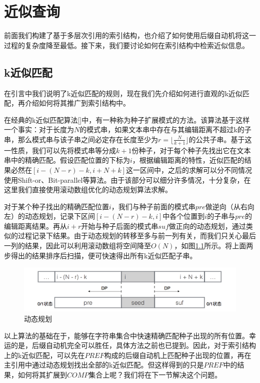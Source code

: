 ﻿\documentclass{sysuthesis}
\begin{document}
\chapter{近似查询}
前面我们构建了基于多层次引用的索引结构，也介绍了如何使用后缀自动机将这一过程的复杂度降至最低。接下来，我们要讨论如何在索引结构中检索近似信息。



\section{k近似匹配}
在引言中我们说明了k近似匹配的规则，现在我们先介绍如何进行直观的k近似匹配，再介绍如何将其推广到索引结构中。\par
在经典的k近似匹配算法[]中，有一种称为种子扩展模式的方法。该算法基于这样一个事实：对于长度为$N$的模式串，如果文本串中存在与其编辑距离不超过k的子串，那么模式串与该子串之间必定存在长度至少为$r = \lfloor \frac{N}{k+1} \rfloor$的公共子串。基于这一性质，我们可以先将模式串等分成$k + 1$份种子，对于每个种子先找出它在文本串中的精确匹配。假设匹配位置的下标为$i$，根据编辑距离的特性，近似匹配的结果必然在$[i - (N - r) - k, i + N + k]$这一区间中，之后的求解可以分不同情况使用Shift-or、Bit-parallel等算法。由于该部分可以细分许多情况，十分复杂，在这里我们直接使用滚动数组优化的动态规划算法求解。\par
对于某个种子找出的精确匹配位置$i$，我们与种子前面的模式串$pre$做逆向（从右向左）的动态规划，记录下区间$[i - (N - r) - k, i]$中各个位置到$i$的子串与$pre$的编辑距离结果。再从$i + r$开始与种子后面的模式串$suf$做正向的动态规划，通过类似的过程记录下结果。由于动态规划的转移至多与前一列有关，而我们只关心最后一列的结果，因此可以利用滚动数组将空间降至$O(N)$，如图\ref{imag_dp}所示。将上面两步得出的结果排序后扫描，便可快速得出所有k近似匹配子串。\par

\begin{figure}[htbp]
	\centering
	\includegraphics[scale=0.35]{image/dp.png}
	\caption{动态规划}\label{imag_dp}
\end{figure}

以上算法的基础在于，能够在字符串集合中快速精确匹配种子出现的所有位置。幸运的是，后缀自动机完全可以胜任，具体方法之前也已提到。因此，对于索引结构上的k近似匹配，可以先在$PREF$构成的后缀自动机上匹配种子出现的位置，再在主引用中通过动态规划找出全部的k近似匹配。但这样得到的只是$PREF$中的结果，如何将其扩展到$COMP$集合上呢？我们将在下一节解决这个问题。
\end{document}
